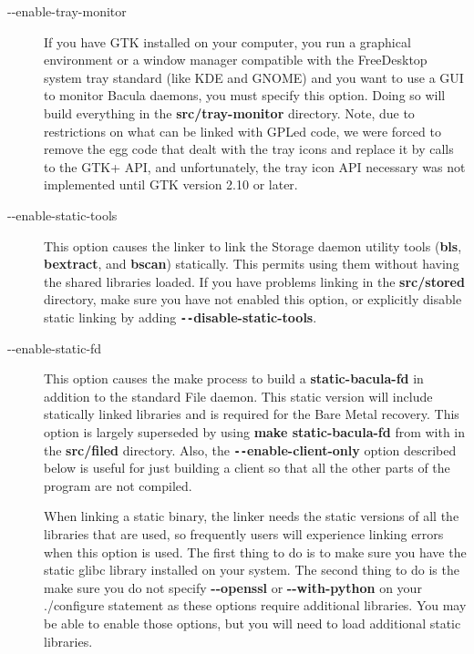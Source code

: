 \begin{description}
\item [ {-}{-}enable-tray-monitor ]
   If you have GTK installed on your computer, you run a graphical
   environment or a window manager compatible with the FreeDesktop system
   tray standard (like KDE and GNOME) and you want to use a GUI to monitor
   Bacula daemons, you must specify this option.  Doing so will build
   everything in the {\bf src/tray-monitor} directory. Note, due to 
   restrictions on what can be linked with GPLed code, we were forced to
   remove the egg code that dealt with the tray icons and replace it by
   calls to the GTK+ API, and unfortunately, the tray icon API necessary
   was not implemented until GTK version 2.10 or later.

\item [ {-}{-}enable-static-tools]
   This option causes the linker to link the Storage daemon utility tools
   ({\bf bls}, {\bf bextract}, and {\bf bscan}) statically.  This permits
   using them without having the shared libraries loaded.  If you have
   problems linking in the {\bf src/stored} directory, make sure you have
   not enabled this option, or explicitly disable static linking by adding
   {\bf \verb:--:disable-static-tools}.

\item [ {-}{-}enable-static-fd]
   This option causes the make process to build a {\bf static-bacula-fd} in
   addition to the standard File daemon.  This static version will include
   statically linked libraries and is required for the Bare Metal recovery.
   This option is largely superseded by using {\bf make static-bacula-fd}
   from with in the {\bf src/filed} directory.  Also, the {\bf
   \verb:--:enable-client-only} option described below is useful for just
   building a client so that all the other parts of the program are not
   compiled.   
     
   When linking a static binary, the linker needs the static versions
   of all the libraries that are used, so frequently users will 
   experience linking errors when this option is used. The first 
   thing to do is to make sure you have the static glibc library 
   installed on your system. The second thing to do is the make sure
   you do not specify {\bf {-}{-}openssl} or {\bf {-}{-}with-python}
   on your ./configure statement as these options require additional
   libraries. You may be able to enable those options, but you will
   need to load additional static libraries.



\end{description}
